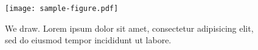 \begin{figure}[h]
  \centering
  \texttt{[image: sample-figure.pdf]}

  \caption{We draw. Lorem ipsum dolor sit amet, consectetur
  adipisicing elit, sed do eiusmod tempor incididunt ut labore.}

  \label{fig:sample}
\end{figure}
